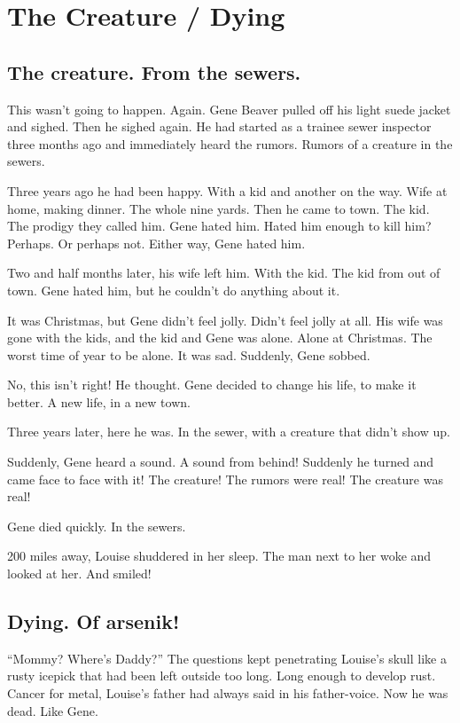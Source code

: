 \chapter{The Creature / Dying}


\section*{The creature. From the sewers.}

This wasn't going to happen. Again. Gene Beaver pulled off his light
suede jacket and sighed. Then he sighed again. He had started as a
trainee sewer inspector three months ago and immediately heard the
rumors. Rumors of a creature in the sewers.

Three years ago he had been happy. With a kid and another on the
way. Wife at home, making dinner. The whole nine yards. Then he came to
town. The kid. The prodigy they called him. Gene hated him. Hated him
enough to kill him? Perhaps. Or perhaps not. Either way, Gene hated him.

Two and half months later, his wife left him. With the kid. The kid from
out of town. Gene hated him, but he couldn't do anything about it.

It was Christmas, but Gene didn't feel jolly. Didn't feel jolly at
all. His wife was gone with the kids, and the kid and Gene was
alone. Alone at Christmas. The worst time of year to be alone. It was
sad. Suddenly, Gene sobbed.

No, this isn't right! He thought. Gene decided to change his life, to
make it better. A new life, in a new town.

Three years later, here he was. In the sewer, with a creature that
didn't show up.

Suddenly, Gene heard a sound. A sound from behind! Suddenly he turned
and came face to face with it! The creature! The rumors were real! The
creature was real!

Gene died quickly. In the sewers.

200 miles away, Louise shuddered in her sleep. The man next to her woke
and looked at her. And smiled!

\section*{Dying. Of arsenik!}



``Mommy? Where's Daddy?'' The questions kept
penetrating Louise's skull like a rusty icepick that had been
left outside too long. Long enough to develop rust. Cancer for
metal, Louise's father had always said in his father-voice. Now he
was dead. Like Gene.




